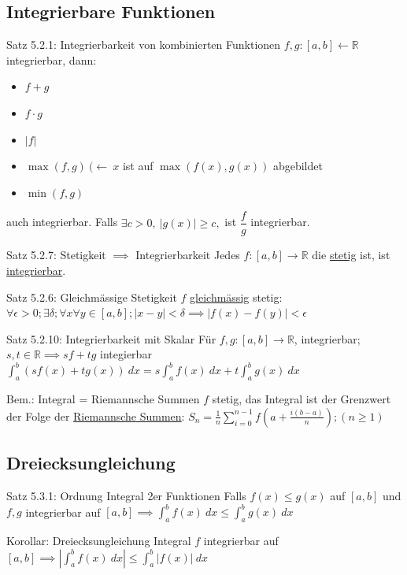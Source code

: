 \documentclass[a4paper,10pt]{article}
\begin{document}
\subsection{Integrierbare Funktionen}
\begin{tbox}
    {Satz 5.2.1: Integrierbarkeit von kombinierten Funktionen}
    $f,g:[a,b]\longleftarrow\mathbb R$ integrierbar, dann:
    \begin{itemize}
        \item $f+g$
        \item $f\cdot g$
        \item $|f|$
        \item $\max(f,g) \ (\leftarrow\ x$ ist auf $\max(f(x),g(x))$ abgebildet
        \item $\min(f,g)$
    \end{itemize}
    auch integrierbar. Falls $\exists c>0,\ |g(x)|\ge c,$ ist $\dfrac{f}{g}$ integrierbar.
\end{tbox}
\begin{tbox}
    {Satz 5.2.7: Stetigkeit $\implies$ Integrierbarkeit}
    Jedes $f:[a,b]\longrightarrow \mathbb R$ die \underline{stetig} ist, ist \underline{integrierbar}.
\end{tbox}
\begin{tbox}
    {Satz 5.2.6: Gleichmässige Stetigkeit}
    $f$ \underline{gleichmässig} stetig: $\forall \epsilon>0; \exists \delta; \forall x \forall y \in [a,b]; |x-y|<\delta\implies |f(x)-f(y)|<\epsilon$ 
\end{tbox}
\begin{tbox}
    {Satz 5.2.10: Integrierbarkeit mit Skalar}
    Für $f,g:[a,b]\longrightarrow \mathbb R$, integrierbar; $s,t\in\mathbb R\implies sf+tg$ integierbar 
    \\$\int_a^b(sf(x)+tg(x))\ dx=s\int_a^bf(x)\ dx + t\int_a^bg(x) \ dx$
\end{tbox}
\begin{bembox}
    {Bem.: Integral = Riemannsche Summen}
    $f$ stetig, das Integral ist der Grenzwert der Folge der \underline{Riemannsche Summen}: $S_n=\frac 1 n\sum_{i=0}^{n-1}f(a+\frac{i(b-a)}n); (n\ge 1)$
\end{bembox}
\subsection{Dreiecksungleichung}
\begin{tbox}
    {Satz 5.3.1: Ordnung Integral 2er Funktionen}
    Falls $f(x)\le g(x)$ auf $[a,b]$ und $f,g$ integrierbar auf $[a,b] \implies \int_a^b f(x)\ dx \le \int_a^b g(x) \ dx$
\end{tbox}
\begin{tbox}
    {Korollar: Dreiecksungleichung Integral}   
    $f$ integrierbar auf $[a,b]\implies |\int_a^b f(x)\ dx|\le\int_a^b|f(x)|\ dx$
\end{tbox}
\end{document}
